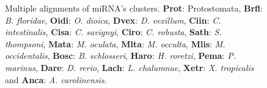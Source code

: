 \documentclass[11pt]{article}
\begin{document}
\begin{figure}[ht!]
    \caption{Multiple alignments of miRNA's clusters. \textbf{Prot}: Protostomata, \textbf{Brfl}: \textit{B. floridae}, 
\textbf{Oidi}: \textit{O. dioica}, \textbf{Dvex}: \textit{D. vexillum}, 
\textbf{Ciin}: \textit{C. intestinalis}, \textbf{Cisa}: \textit{C. savignyi}, 
\textbf{Ciro}: \textit{C. robusta}, \textbf{Sath}: \textit{S. thompsoni}, 
\textbf{Mata}: \textit{M. oculata}, \textbf{Mlta}: \textit{M. occulta}, 
\textbf{Mlis}: \textit{M. occidentalis}, \textbf{Bosc}: \textit{B. schlosseri}, 
\textbf{Haro}: \textit{H. roretzi}, \textbf{Pema}: \textit{P. marinus}, 
\textbf{Dare}: \textit{D. rerio}, \textbf{Lach}: \textit{L. chalumnae}, 
\textbf{Xetr}: \textit{X. tropicalis} and \textbf{Anca}: \textit{A. 
carolinensis}.} \label{altclusters}
\end{figure}









\newpage
\end{document}
